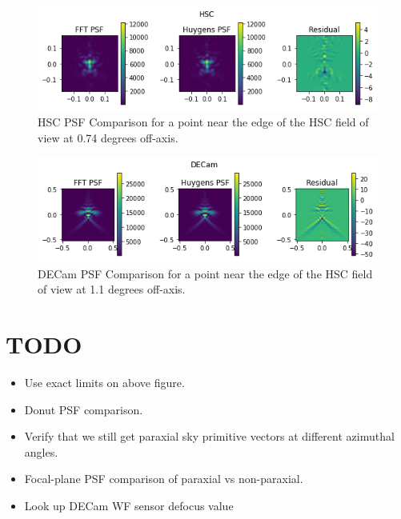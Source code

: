 \documentclass{article}
\begin{document}
\begin{figure}
    \includegraphics[scale=0.8]{HSC_PSF_comparison.png}

    \caption{HSC PSF Comparison for a point near the edge of the HSC field of view at 0.74 degrees
    off-axis.}

    \label{fig:HSC_psf_comparison}
\end{figure}

\begin{figure}
    \includegraphics[scale=0.8]{DECam_PSF_comparison.png}

    \caption{DECam PSF Comparison for a point near the edge of the HSC field of view at 1.1 degrees
    off-axis.}

    \label{fig:DECam_psf_comparison}
\end{figure}

\section{TODO}

\begin{itemize}
    \item Use exact limits on above figure.
    \item Donut PSF comparison.
    \item Verify that we still get paraxial sky primitive vectors at different azimuthal angles.
    \item Focal-plane PSF comparison of paraxial vs non-paraxial.
    \item Look up DECam WF sensor defocus value
\end{itemize}
\end{document}
